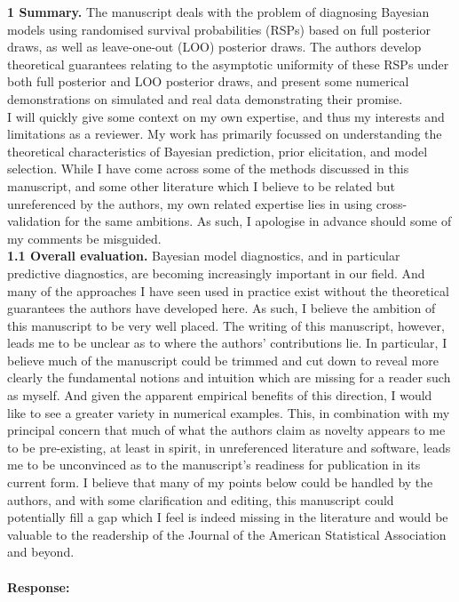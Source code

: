 \documentclass[11pt]{article}
\newcommand*{\mybox}[2]{%
  \par\medskip\noindent
  \colorbox{#1!30}{\parbox{.98\linewidth}{#2}}%
  \par\medskip
}
\begin{document}
\mybox{gray}{\textbf{1 Summary.} The manuscript deals with the problem of diagnosing Bayesian models using randomised survival probabilities (RSPs) based on full posterior draws, as well as leave-one-out (LOO) posterior draws. The authors develop theoretical guarantees relating to the asymptotic uniformity of these RSPs under both full posterior and LOO posterior draws, and present some numerical demonstrations on simulated and real data demonstrating their promise. \\
I will quickly give some context on my own expertise, and thus my interests and limitations as a reviewer. My work has primarily focussed on understanding the theoretical characteristics of Bayesian prediction, prior elicitation, and model selection. While I have come across some of the methods discussed in this manuscript, and some other literature which I believe to be related but unreferenced by the authors, my own related expertise lies in using cross-validation for the same ambitions. As such, I apologise in advance should some of my comments be misguided.\\[5pt]
\textbf{1.1 Overall evaluation.} Bayesian model diagnostics, and in particular predictive diagnostics, are becoming increasingly important in our field. And many of the approaches I have seen used in practice exist without the theoretical guarantees the authors have developed here. As such, I believe the ambition of this manuscript to be very well placed. The writing of this manuscript, however, leads me to be unclear as to where the authors' contributions lie. In particular, I believe much of the manuscript could be trimmed and cut down to reveal more clearly the fundamental notions and intuition which are missing for a reader such as myself. And given the apparent empirical benefits of this direction, I would like to see a greater variety in numerical examples. This, in combination with my principal concern that much of what the authors claim as novelty appears to me to be pre-existing, at least in spirit, in unreferenced literature and software, leads me to be unconvinced as to the manuscript's readiness for publication in its current form. I believe that many of my points below could be handled by the authors, and with some clarification and editing, this manuscript could potentially fill a gap which I feel is indeed missing in the literature and would be valuable to the readership of the Journal of the American Statistical Association and beyond.}


\paragraph{Response:} 
\end{document}
